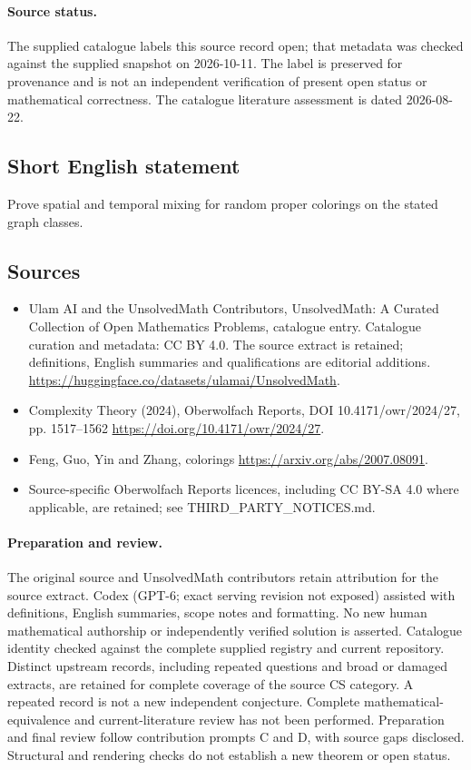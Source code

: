 \documentclass[11pt]{article}
\begin{document}
\paragraph{Source status.}
The supplied catalogue labels this source record open; that metadata was checked against the supplied snapshot on 2026-10-11. The label is preserved for provenance and is not an independent verification of present open status or mathematical correctness. The catalogue literature assessment is dated 2026-08-22.
\subsection{Short English statement}
Prove spatial and temporal mixing for random proper colorings on the stated graph classes.
\subsection{Sources}
\begin{itemize}
\item[S1] Ulam AI and the UnsolvedMath Contributors, UnsolvedMath: A Curated Collection of Open Mathematics Problems, catalogue entry. Catalogue curation and metadata: CC BY 4.0. The source extract is retained; definitions, English summaries and qualifications are editorial additions.
\url{https://huggingface.co/datasets/ulamai/UnsolvedMath}.
\item[S2] Complexity Theory (2024), Oberwolfach Reports, DOI 10.4171/owr/2024/27, pp. 1517--1562
\url{https://doi.org/10.4171/owr/2024/27}.
\item[S3] Feng, Guo, Yin and Zhang, colorings
\url{https://arxiv.org/abs/2007.08091}.
\item Source-specific Oberwolfach Reports licences, including CC BY-SA 4.0 where applicable, are retained; see THIRD\_PARTY\_NOTICES.md.
\end{itemize}
\paragraph{Preparation and review.}
The original source and UnsolvedMath contributors retain attribution for the source extract. Codex (GPT-6; exact serving revision not exposed) assisted with definitions, English summaries, scope notes and formatting. No new human mathematical authorship or independently verified solution is asserted. Catalogue identity checked against the complete supplied registry and current repository. Distinct upstream records, including repeated questions and broad or damaged extracts, are retained for complete coverage of the source CS category. A repeated record is not a new independent conjecture. Complete mathematical-equivalence and current-literature review has not been performed. Preparation and final review follow contribution prompts C and D, with source gaps disclosed. Structural and rendering checks do not establish a new theorem or open status.
\label{end:statement}
\end{document}
